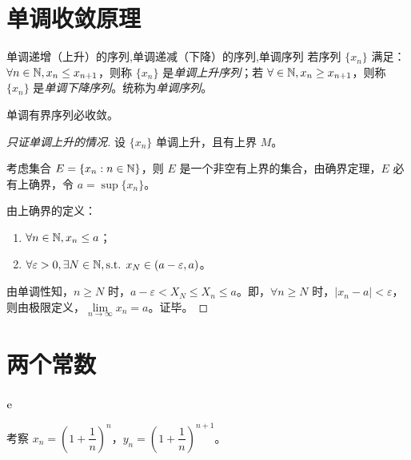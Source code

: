 
\section{单调收敛原理}

\begin{definition}{单调递增（上升）的序列,单调递减（下降）的序列,单调序列}
	若序列 $\{x_n\}$ 满足：$\forall n \in \mathbb N, x_n \le x_{n + 1}$，则称 $\{x_n\}$ 是\emph{单调上升序列}；若 $\forall \in \mathbb N, x_n \ge x_{n + 1}$，则称 $\{x_n\}$ 是\emph{单调下降序列}。统称为\emph{单调序列}。
\end{definition}

\begin{theorem}[单调收敛原理]
	单调有界序列必收敛。
\end{theorem}

\begin{proof}[只证单调上升的情况]
	设 $\{x_n\}$ 单调上升，且有上界 $M$。

	考虑集合 $E = \{x_n: n \in \mathbb N\}$，则 $E$ 是一个非空有上界的集合，由确界定理，$E$ 必有上确界，令 $a = \sup \{x_n\}$。

	由上确界的定义：

	\begin{enumerate}
		\item $\forall n \in \mathbb N, x_n \le a$；
		\item $\forall \varepsilon > 0, \exists N \in \mathbb N, \text{s.t. } x_N \in (a - \varepsilon, a)$。
	\end{enumerate}

	由单调性知，$n \ge N$ 时，$a - \varepsilon < X_N \le X_n \le a$。即，$\forall n \ge N$ 时，$|x_n - a| < \varepsilon$，则由极限定义，$\lim\limits_{n \rightarrow \infty} x_n = a$。证毕。
\end{proof}

\section{两个常数}

\subsection{$\mathrm e$}

考察 $x_n = \left( 1 + \dfrac{1}{n} \right)^n$，$y_n = \left( 1 + \dfrac{1}{n} \right)^{n + 1}$。


